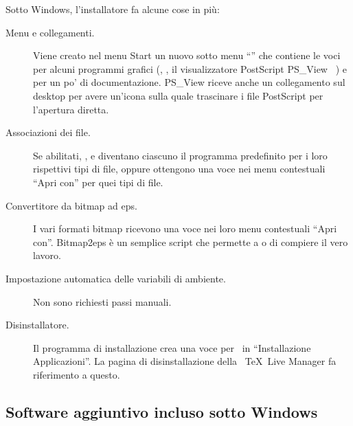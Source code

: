 \documentclass{article}
\begin{document}
Sotto Windows, l'installatore fa alcune cose in più:
\begin{description}
\item[Menu e collegamenti.] Viene creato nel menu Start un nuovo sotto
  menu ``\TL'' che contiene le voci per alcuni programmi grafici
  (, , il visualizzatore PostScript PS\_View
  \Dash\ ) e per un po' di documentazione. PS\_View riceve anche
  un collegamento sul desktop per avere un'icona sulla quale trascinare i
  file PostScript per l'apertura diretta.
\item[Associazioni dei file.] Se abilitati, ,  e
   diventano ciascuno il programma predefinito per i loro
  rispettivi tipi di file, oppure ottengono una voce nei menu contestuali
  ``Apri con'' per quei tipi di file.
\item[Convertitore da bitmap ad eps.] I vari formati bitmap ricevono una
  voce  nei loro menu contestuali ``Apri con''.
  Bitmap2eps è un semplice script che permette a  o
   di compiere il vero lavoro.
\item[Impostazione automatica delle variabili di ambiente.] Non sono
  richiesti passi manuali.
\item[Disinstallatore.] Il programma di installazione crea una voce per
  \TL\ in ``Installazione Applicazioni''. La pagina di disinstallazione
  della \GUI\ \TeX\ Live Manager fa riferimento a questo.
\end{description}

\subsection{Software aggiuntivo incluso sotto Windows}
\end{document}
